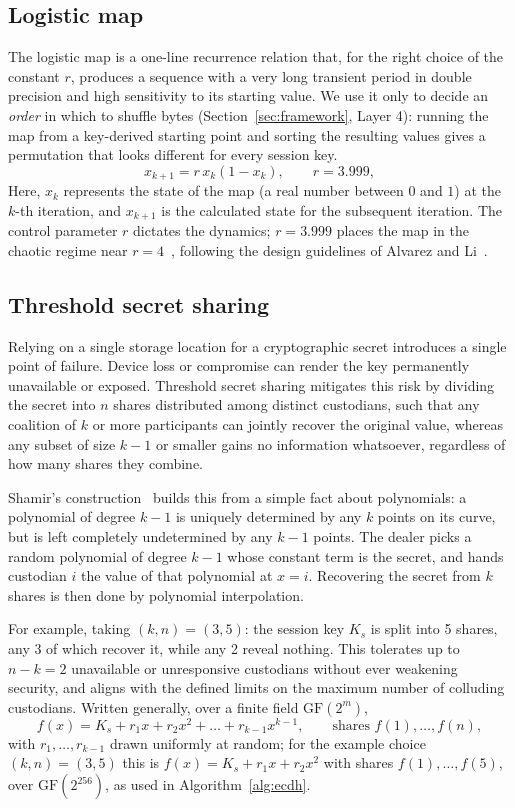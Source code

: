 \documentclass[pdflatex,sn-mathphys-num]{sn-jnl}%
\theoremstyle{thmstyleone}%
\theoremstyle{thmstyletwo}%
\theoremstyle{thmstylethree}%
\begin{document}
\subsection{Logistic map}
\label{sec:logistic}
The logistic map is a one-line recurrence relation that, for the right choice of
the constant $r$, produces a sequence with a very long transient period in double precision and high sensitivity to its starting value. We use it only to decide an \emph{order} in which to
shuffle bytes (Section~\ref{sec:framework}, Layer 4): running the map from a
key-derived starting point and sorting the resulting values gives a permutation
that looks different for every session key.
\begin{equation}
x_{k+1} = r\,x_k(1-x_k), \qquad r = 3.999,
\label{eq:logistic}
\end{equation}
Here, $x_k$ represents the state of the map (a real number between $0$ and $1$) at the $k$-th iteration, and $x_{k+1}$ is the calculated state for the subsequent iteration. The control parameter $r$ dictates the dynamics; $r=3.999$ places the map in the chaotic regime near $r=4$~\cite{may1976}, following the design guidelines of Alvarez and Li~\cite{alvarez2006}.


\subsection{Threshold secret sharing}
\label{sec:shamir}
Relying on a single storage location for a cryptographic secret introduces a
single point of failure. Device loss or compromise can render the key
permanently unavailable or exposed. Threshold secret sharing mitigates this
risk by dividing the secret into $n$ shares distributed among distinct
custodians, such that any coalition of $k$ or more participants can jointly
recover the original value, whereas any subset of size $k-1$ or smaller gains
no information whatsoever, regardless of how many shares they combine.

Shamir's construction~\cite{shamir1979} builds this from a simple fact about
polynomials: a polynomial of degree $k-1$ is uniquely determined by any $k$
points on its curve, but is left completely undetermined by any $k-1$ points.
The dealer picks a random polynomial of degree $k-1$ whose constant term is the
secret, and hands custodian $i$ the value of that polynomial at $x=i$. Recovering
the secret from $k$ shares is then done by polynomial interpolation.

For example, taking $(k,n)=(3,5)$: the session key $K_s$ is split into
5 shares, any 3 of which recover it, while any 2 reveal nothing. This tolerates
up to $n-k=2$ unavailable or unresponsive custodians without ever weakening
security, and aligns with the defined limits on the maximum number of
colluding custodians. Written generally, over a finite field $\mathrm{GF}(2^m)$,
\begin{equation}
f(x) = K_s + r_1 x + r_2 x^2 + \dots + r_{k-1}x^{k-1}, \qquad \text{shares } f(1),\dots,f(n),
\label{eq:share}
\end{equation}
with $r_1,\dots,r_{k-1}$ drawn uniformly at random; for the example choice
$(k,n)=(3,5)$ this is $f(x)=K_s+r_1x+r_2x^2$ with shares $f(1),\dots,f(5)$, over
$\mathrm{GF}(2^{256})$, as used in Algorithm~\ref{alg:ecdh}.
\end{document}
